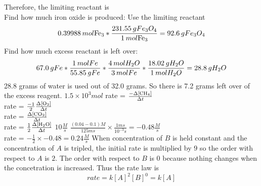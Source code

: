 \documentclass{article}
\begin{document}
Therefore, the limiting reactant is  \\
Find how much iron oxide is produced: Use the limiting reactant
\begin{equation}
    0.39988\hspace{0.2em}mol \ce{Fe_{3}} * \frac{231.55\hspace{0.2em}gFe_{3}O_{4}}{1\hspace{0.2em} mol\ce{Fe_{3}}} = 92.6 \hspace{0.2em}g Fe_{3}O_{4}
\end{equation}
Find how much excess reactant is left over:
\begin{equation}
    67.0\hspace{0.2em}gFe * \frac{1\hspace{0.2em}molFe}{55.85\hspace{0.2em}gFe} * \frac{4\hspace{0.2em}mol H_{2}O}{3\hspace{0.2em}molFe} * \frac{18.02\hspace{0.2em}gH_{2}O}{1\hspace{0.2em}molH_{2}O} = 28.8\hspace{0.2em}g H_{2}O
\end{equation}
28.8 grams of water is used out of 32.0 grams. So there is 7.2 grams left over of the excess reagent. 
\AnswerSet
\(1.5 \times 10^3mol\) 
\AnswerSet 
{} \hspace{0.5em} rate = \(\frac{-\Delta [\ce{CH4}]}{\Delta t}\) \\
 \hspace{0.5em} rate = \(\frac{-1}{2} \frac{\Delta [\ce{O2}]}{\Delta t}\) \\
 \hspace{0.5em} rate = \(\frac{\Delta [\ce{CO2}]}{\Delta t}\) \\
 \hspace{0.5em} rate = \(\frac{1}{2} \frac{\Delta [\ce{H2O}]}{\Delta t}\)
\AnswerSet
\(10\frac{M}{s}\)
\AnswerSet
\(\frac{(0.04 - 0.1)M}{125ms} \times \frac{1ms}{10^{-3}s} = -0.48 \frac{M}{s}\)\\
rate = \(-\frac{1}{2} \times -0.48 = 0.24 \frac{M}{s}\)
\AnswerSet
When concentration of \(B\) is held constant and the concentration of \(A\) is tripled, the initial rate is multiplied by \(9\) so the order with respect to \(A\)
is \(2\). The order with respect to \(B\) is \(0\) because nothing changes when the concetration is increased. Thus the rate law is 
\begin{equation*}
    rate = k[A]^2[B]^0 = k[A]
\end{equation*}
\end{document}
